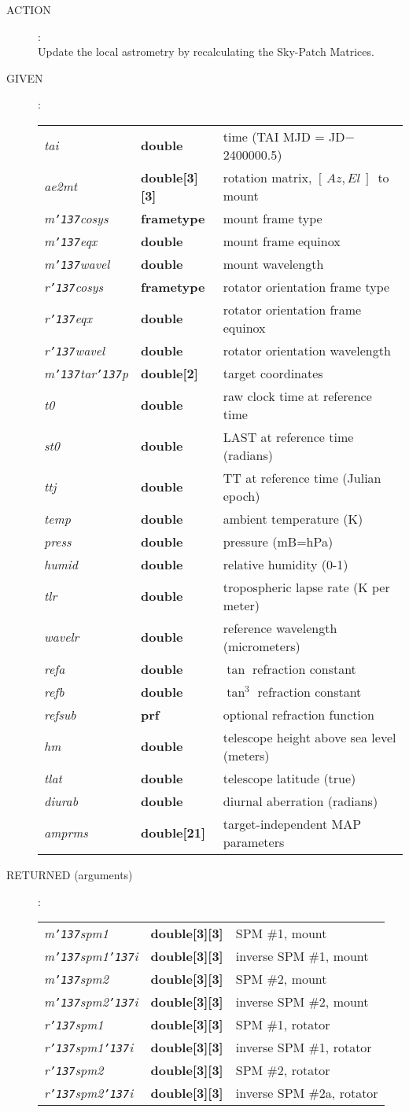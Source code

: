 \documentclass[12pt,fleqn,twoside]{article}
\renewcommand{\_}{{\tt\char'137}}     %
\newcommand{\azel}      {$[\,Az,El~]$}
\newcommand{\action}[1]
{
  \goodbreak
  \begin{description}
    \item[ACTION]: \\[0.5ex] \nopagebreak
        #1
  \end{description}
  \vspace{-3ex}
}
\newcommand{\args}[2]
{
  \goodbreak
  \begin{description}
  \item[#1]: \\[1.5ex] \nopagebreak
    \hspace*{-0.9em}
    \begin{tabular}{p{4.5em}p{5.8em}p{23.5em}}
      #2
    \end{tabular}
  \end{description}
  \vspace{-3ex}
}
\newcommand{\spec}[3]
{
  {\em {#1}} & {\bf \mbox{#2}} & {#3}
}
\begin{document}
\action{Update the local astrometry by recalculating the
        Sky-Patch Matrices.}
\args{GIVEN}
{
\spec{tai}{double}{time (TAI MJD = JD$-$2400000.5)} \\
\spec{ae2mt}{double[3][3]}{rotation matrix, \azel\ to mount} \\
\spec{m\_cosys}{\sc frametype}{mount frame type} \\
\spec{m\_eqx}{double}{mount frame equinox} \\
\spec{m\_wavel}{double}{mount wavelength} \\
\spec{r\_cosys}{\sc frametype}{rotator orientation frame type} \\
\spec{r\_eqx}{double}{rotator orientation frame equinox} \\
\spec{r\_wavel}{double}{rotator orientation wavelength} \\
\spec{m\_tar\_p}{double[2]}{target coordinates} \\
\spec{t0}{double}{raw clock time at reference time} \\
\spec{st0}{double}{LAST at reference time (radians)} \\
\spec{ttj}{double}{TT at reference time (Julian epoch)} \\
\spec{temp}{double}{ambient temperature (K)} \\
\spec{press}{double}{pressure (mB=hPa)} \\
\spec{humid}{double}{relative humidity (0-1)    } \\
\spec{tlr}{double}{tropospheric lapse rate (K per meter)} \\
\spec{wavelr}{double}{reference wavelength (micrometers)} \\
\spec{refa}{double}{$\tan$ refraction constant} \\
\spec{refb}{double}{$\tan^3$ refraction constant} \\
\spec{refsub}{\sc prf}{optional refraction function} \\
\spec{hm}{double}{telescope height above sea level (meters)} \\
\spec{tlat}{double}{telescope latitude (true)} \\
\spec{diurab}{double}{diurnal aberration (radians)} \\
\spec{amprms}{double[21]}{target-independent MAP parameters}
}
\args{RETURNED \rm (arguments)}
{
\spec{m\_spm1}{double[3][3]}{SPM \#1, mount} \\
\spec{m\_spm1\_i}{double[3][3]}{inverse SPM \#1, mount} \\
\spec{m\_spm2}{double[3][3]}{SPM \#2, mount} \\
\spec{m\_spm2\_i}{double[3][3]}{inverse SPM \#2, mount} \\
\spec{r\_spm1}{double[3][3]}{SPM \#1, rotator} \\
\spec{r\_spm1\_i}{double[3][3]}{inverse SPM \#1, rotator} \\
\spec{r\_spm2}{double[3][3]}{SPM \#2, rotator} \\
\spec{r\_spm2\_i}{double[3][3]}{inverse SPM \#2a, rotator}
}
\end{document}
